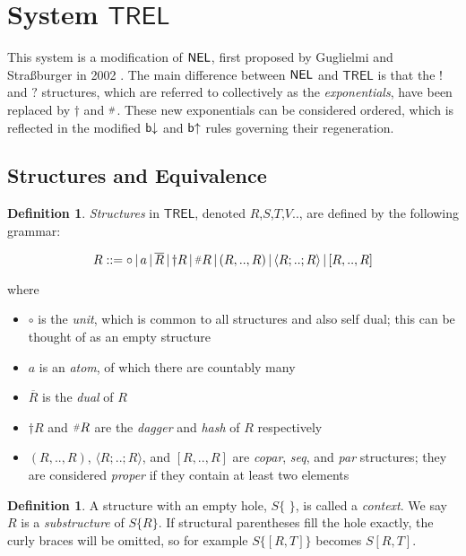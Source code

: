\documentclass[11pt, oneside]{article}
\theoremstyle{plain}
\theoremstyle{definition}
\newtheorem{definition}[theorem]{Definition}
\let\originaldagger\dagger
\renewcommand{\dag}{\mathord{\originaldagger}}
\newcommand{\hash}{\mathord{\raisebox{0.3ex}{\scalebox{0.7}{$\mathstrut \# $}}}}
\newcommand{\la}{\langle}
\newcommand{\ra}{\rangle}
\newcommand{\sSys}{{\mathsf{TREL}}}%
\newcommand{\unit}{\circ}
\begin{document}
\newpage
\section{System $\sSys$}

This system is a modification of ${\mathsf{NEL}}$, first proposed by Guglielmi and Straßburger in 2002 \cite{guglielmi2002non}.
The main difference between ${\mathsf{NEL}}$ and $\sSys$ is that the $!$ and $?$ structures, which are referred to collectively as the \textit{exponentials}, have been replaced by $\dag$ and $\hash$.
These new exponentials can be considered ordered, which is reflected in the modified ${\mathsf b}{\downarrow}$ and ${\mathsf b}{ \uparrow}$ rules governing their regeneration.

\subsection{Structures and Equivalence}

\begin{definition}
\textit{Structures} in $\sSys$, denoted $R$,$S$,$T$,$V$.., are defined by the following grammar:

\[R ::= \unit \,|\, a \,|\, \overline{R} \,|\, \dag R \,|\, \hash R \,|\, (R,..,R) \,|\, \la R;..;R\ra \,|\, [R,..,R]\]

where
\begin{itemize}
\item $\unit$ is the \textit{unit}, which is common to all structures and also self dual; this can be thought of as an empty structure
\item $a$ is an \textit{atom}, of which there are countably many
\item $\overline{R}$ is the \textit{dual} of $R$
\item $\dag R$ and $\hash R$ are the \textit{dagger} and \textit{hash} of $R$ respectively
\item $(R,..,R)$, $\la R;..;R\ra$, and $[R,..,R]$ are \textit{copar}, \textit{seq}, and \textit{par} structures; they are considered \textit{proper} if they contain at least two elements
\end{itemize}
\end{definition}

\begin{definition}
A structure with an empty hole, $S\{\,\,\}$, is called a \textit{context}.
We say $R$ is a \textit{substructure} of $S\{R\}$.
If structural parentheses fill the hole exactly, the curly braces will be omitted, so for example $S\{[R,T]\}$ becomes $S[R,T]$.
\end{definition}
\end{document}
